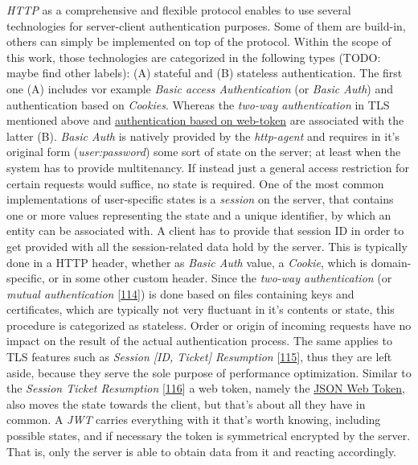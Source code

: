 \documentclass[12pt,english,a4paper,titlepage,cleardoublepage=empty,dottedtoc]{report}
\begin{document}
\emph{HTTP} as a comprehensive and flexible protocol enables to use
several technologies for server-client authentication purposes. Some of
them are build-in, others can simply be implemented on top of the
protocol. Within the scope of this work, those technologies are
categorized in the following types (TODO: maybe find other labels): (A)
stateful and (B) stateless authentication. The first one (A) includes
vor example \emph{Basic access Authentication} (or \emph{Basic Auth})
and authentication based on \emph{Cookies}. Whereas the \emph{two-way
authentication} in TLS mentioned above and
\protect\hyperlink{link_jwt}{authentication based on web-token} are
associated with the latter (B). \emph{Basic Auth} is natively provided
by the \emph{http-agent} and requires in it's original form
(\emph{user:password}) some sort of state on the server; at least when
the system has to provide multitenancy. If instead just a general access
restriction for certain requests would suffice, no state is required.
One of the most common implementations of user-specific states is a
\emph{session} on the server, that contains one or more values
representing the state and a unique identifier, by which an entity can
be associated with. A client has to provide that session ID in order to
get provided with all the session-related data hold by the server. This
is typically done in a HTTP header, whether as \emph{Basic Auth} value,
a \emph{Cookie}, which is domain-specific, or in some other custom
header. Since the \emph{two-way authentication} (or \emph{mutual
authentication}
{[}\protect\hyperlink{ref-web_2017_wikipedia_mutual-auth}{114}{]}) is
done based on files containing keys and certificates, which are
typically not very fluctuant in it's contents or state, this procedure
is categorized as stateless. Order or origin of incoming requests have
no impact on the result of the actual authentication process. The same
applies to TLS features such as \emph{Session {[}ID, Ticket{]}
Resumption}
{[}\protect\hyperlink{ref-book_2013_networking-101_tls-session-resumption}{115}{]},
thus they are left aside, because they serve the sole purpose of
performance optimization. Similar to the \emph{Session Ticket
Resumption}
{[}\protect\hyperlink{ref-web_spec_tls-session-ticket-resumption}{116}{]}
a web token, namely the \protect\hyperlink{link_jwt}{JSON Web Token},
also moves the state towards the client, but that's about all they have
in common. A \emph{JWT} carries everything with it that's worth knowing,
including possible states, and if necessary the token is symmetrical
encrypted by the server. That is, only the server is able to obtain data
from it and reacting accordingly.
\end{document}
